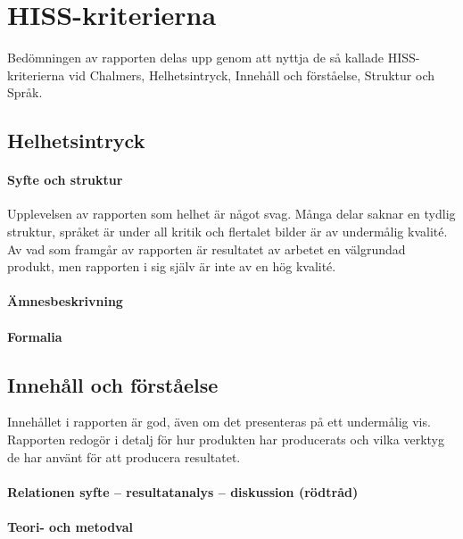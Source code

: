 \section{HISS-kriterierna} %
\label{sec:hiss}
    Bedömningen av rapporten delas upp genom att nyttja de så kallade HISS-kriterierna vid Chalmers, Helhetsintryck, Innehåll och förståelse, Struktur och Språk.

    \subsection{Helhetsintryck} %
    \label{sub:helhetsintryck}
    \paragraph{Syfte och struktur}
        Upplevelsen av rapporten som helhet är något svag. Många delar saknar en tydlig struktur, språket är under all kritik och flertalet bilder är av undermålig kvalité. Av vad som framgår av rapporten är resultatet av arbetet en välgrundad produkt, men rapporten i sig själv är inte av en hög kvalité.

    \paragraph{Ämnesbeskrivning}

    \paragraph{Formalia}


    \subsection{Innehåll och förståelse} %
    \label{sub:innehall}
    Innehållet i rapporten är god, även om det presenteras på ett undermålig vis. Rapporten redogör i detalj för hur produkten har producerats och vilka verktyg de har använt för att producera resultatet.
    \paragraph{Relationen syfte – resultatanalys – diskussion (rödtråd)}

    \paragraph{Teori- och metodval}

